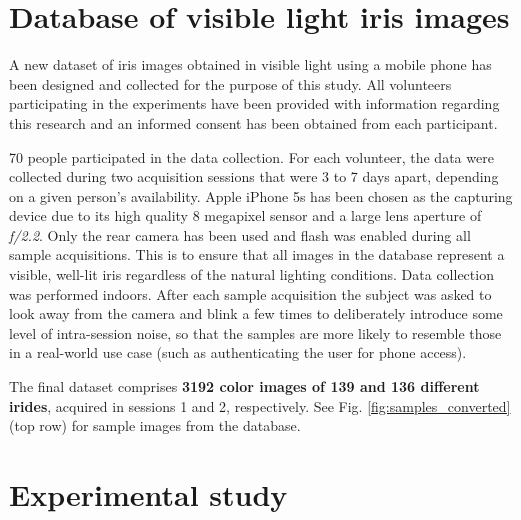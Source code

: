 \documentclass[10pt,twocolumn,letterpaper]{article}
\begin{document}
  
\section{Database of visible light iris images}
\label{section:database}
A new dataset of iris images obtained in visible light using a mobile phone has been designed and collected for the purpose of this study. All volunteers participating in the experiments have been provided with information regarding this research and an informed consent has been obtained from each participant. 

70 people participated in the data collection. For each volunteer, the data were collected during two acquisition sessions that were 3 to 7 days apart, depending on a given person's availability. Apple iPhone 5s has been chosen as the capturing device due to its high quality 8 megapixel sensor and a large lens aperture of \emph{f/2.2}. Only the rear camera has been used and flash was enabled during all sample acquisitions. This is to ensure that all images in the database represent a visible, well-lit iris regardless of the natural lighting conditions. Data collection was performed indoors. After each sample acquisition the subject was asked to look away from the camera and blink a few times to deliberately introduce some level of intra-session noise, so that the samples are more likely to resemble those in a real-world use case (such as authenticating the user for phone access). 
\pagebreak

The final dataset comprises \textbf{3192 color images of 139 and 136 different irides}, acquired in sessions 1 and 2, respectively. See Fig. \ref{fig:samples_converted} (top row) for sample images from the database. 

\section{Experimental study}
\label{section:experiments}
\end{document}
